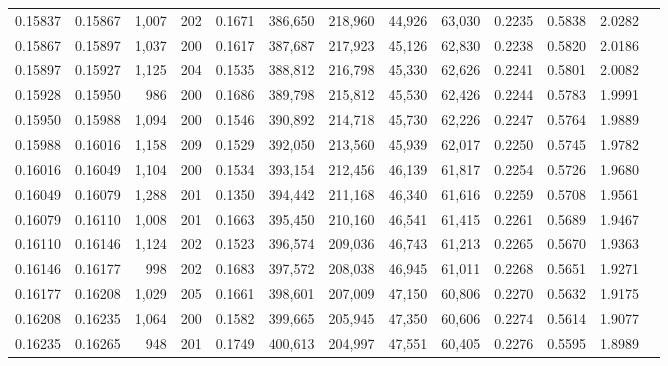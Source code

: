 \begin{tabular}{rrrrrrrrrrrrr}
0.15837 & 0.15867 & 1,007 & 202 &                                     0.1671 & 386,650 & 218,960 &  44,926 &  63,030 & 0.2235 & 0.5838 & 2.0282 \\
0.15867 & 0.15897 & 1,037 & 200 &                                     0.1617 & 387,687 & 217,923 &  45,126 &  62,830 & 0.2238 & 0.5820 & 2.0186 \\
0.15897 & 0.15927 & 1,125 & 204 &                                     0.1535 & 388,812 & 216,798 &  45,330 &  62,626 & 0.2241 & 0.5801 & 2.0082 \\
0.15928 & 0.15950 &   986 & 200 &                                     0.1686 & 389,798 & 215,812 &  45,530 &  62,426 & 0.2244 & 0.5783 & 1.9991 \\
0.15950 & 0.15988 & 1,094 & 200 &                                     0.1546 & 390,892 & 214,718 &  45,730 &  62,226 & 0.2247 & 0.5764 & 1.9889 \\
0.15988 & 0.16016 & 1,158 & 209 &                                     0.1529 & 392,050 & 213,560 &  45,939 &  62,017 & 0.2250 & 0.5745 & 1.9782 \\
0.16016 & 0.16049 & 1,104 & 200 &                                     0.1534 & 393,154 & 212,456 &  46,139 &  61,817 & 0.2254 & 0.5726 & 1.9680 \\
0.16049 & 0.16079 & 1,288 & 201 &                                     0.1350 & 394,442 & 211,168 &  46,340 &  61,616 & 0.2259 & 0.5708 & 1.9561 \\
0.16079 & 0.16110 & 1,008 & 201 &                                     0.1663 & 395,450 & 210,160 &  46,541 &  61,415 & 0.2261 & 0.5689 & 1.9467 \\
0.16110 & 0.16146 & 1,124 & 202 &                                     0.1523 & 396,574 & 209,036 &  46,743 &  61,213 & 0.2265 & 0.5670 & 1.9363 \\
0.16146 & 0.16177 &   998 & 202 &                                     0.1683 & 397,572 & 208,038 &  46,945 &  61,011 & 0.2268 & 0.5651 & 1.9271 \\
0.16177 & 0.16208 & 1,029 & 205 &                                     0.1661 & 398,601 & 207,009 &  47,150 &  60,806 & 0.2270 & 0.5632 & 1.9175 \\
0.16208 & 0.16235 & 1,064 & 200 &                                     0.1582 & 399,665 & 205,945 &  47,350 &  60,606 & 0.2274 & 0.5614 & 1.9077 \\
0.16235 & 0.16265 &   948 & 201 &                                     0.1749 & 400,613 & 204,997 &  47,551 &  60,405 & 0.2276 & 0.5595 & 1.8989 \\

\end{tabular}
